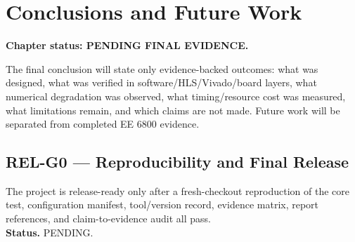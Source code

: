 \chapter{Conclusions and Future Work}
\label{ch:conclusion}
\textbf{Chapter status: PENDING FINAL EVIDENCE.}

The final conclusion will state only evidence-backed outcomes: what was designed, what was
verified in software/HLS/Vivado/board layers, what numerical degradation was observed,
what timing/resource cost was measured, what limitations remain, and which claims are not
made. Future work will be separated from completed EE 6800 evidence.

\section{REL-G0 --- Reproducibility and Final Release}
The project is release-ready only after a fresh-checkout reproduction of the core test,
configuration manifest, tool/version record, evidence matrix, report references, and
claim-to-evidence audit all pass.\\
\textbf{Status.} PENDING.
